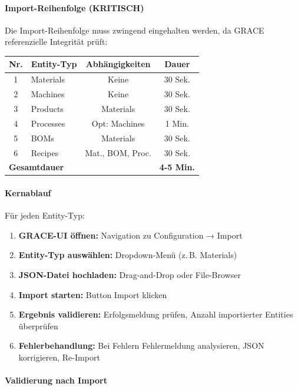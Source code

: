 \paragraph{Import-Reihenfolge (KRITISCH)}

Die Import-Reihenfolge muss zwingend eingehalten werden, da GRACE referenzielle Integrität prüft:

\begin{table}[h]
\centering
\begin{tabular}{clcc}
\toprule
\textbf{Nr.} & \textbf{Entity-Typ} & \textbf{Abhängigkeiten} & \textbf{Dauer} \\
\midrule
1 & Materials & Keine & 30 Sek. \\
2 & Machines & Keine & 30 Sek. \\
3 & Products & Materials & 30 Sek. \\
4 & Processes & Opt: Machines & 1 Min. \\
5 & BOMs & Materials & 30 Sek. \\
6 & Recipes & Mat., BOM, Proc. & 30 Sek. \\
\midrule
\multicolumn{3}{l}{\textbf{Gesamtdauer}} & \textbf{4-5 Min.} \\
\bottomrule
\end{tabular}
\end{table}

\paragraph{Kernablauf}

Für jeden Entity-Typ:

\begin{enumerate}
    \item \textbf{GRACE-UI öffnen:} Navigation zu Configuration → Import
    \item \textbf{Entity-Typ auswählen:} Dropdown-Menü (z.\,B. \glqq Materials\grqq{})
    \item \textbf{JSON-Datei hochladen:} Drag-and-Drop oder File-Browser
    \item \textbf{Import starten:} Button \glqq Import\grqq{} klicken
    \item \textbf{Ergebnis validieren:} Erfolgsmeldung prüfen, Anzahl importierter Entities überprüfen
    \item \textbf{Fehlerbehandlung:} Bei Fehlern Fehlermeldung analysieren, JSON korrigieren, Re-Import
\end{enumerate}

\paragraph{Validierung nach Import}

